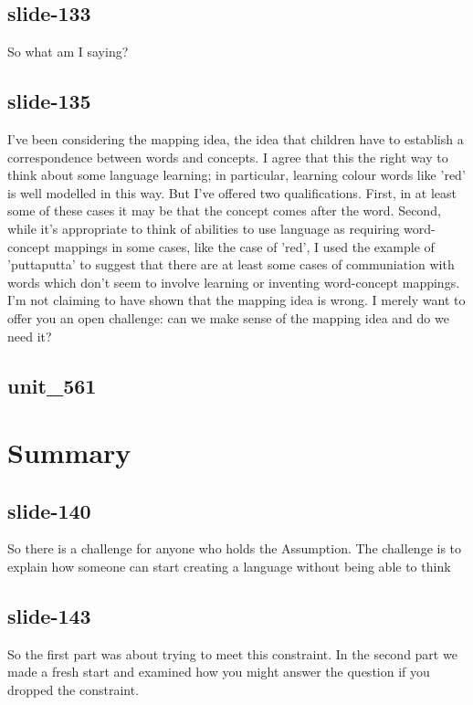 \documentclass[12pt,\papersize]{extarticle}
\begin{document}
 
\subsection{slide-133}
So what am I saying?
 
 
\subsection{slide-135}
I've been considering the mapping idea, the idea that children have to establish a correspondence between words and concepts.
I agree that this the right way to think about some language learning; in particular, learning colour words like 'red' is well modelled in this way.
But I've offered two qualifications.
First, in at least some of these cases it may be that the concept comes after the word.
Second, while it's appropriate to think of abilities to use language as requiring word-concept mappings in some cases, like the case of 'red',
I used the example of 'puttaputta' to suggest that there are at least some cases of communiation with words which don't seem to involve learning or inventing word-concept mappings.
I'm not claiming to have shown that the mapping idea is wrong.
I merely want to offer you an open challenge: can we make sense of the mapping idea and do we need it?
 
 
\subsection{unit\_561}
 
\section{Summary}
 
 
\subsection{slide-140}
So there is a challenge for anyone who holds the Assumption.
The challenge is to explain how someone can start creating a language without being able to think
 
 
\subsection{slide-143}
So the first part was about trying to meet this constraint.
In the second part we made a fresh start and examined how you might answer the question if you dropped the constraint.
 
\end{document}
